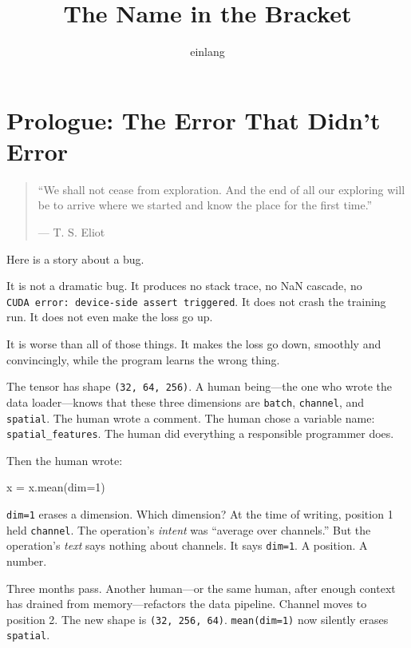 \documentclass[11pt,]{article}
\title{The Name in the Bracket}
\author{einlang}
\date{}
\newenvironment{Shaded}{}{}
\newcommand{\DecValTok}[1]{\textcolor[rgb]{0.25,0.63,0.44}{#1}}
\newcommand{\NormalTok}[1]{#1}
\newcommand{\OperatorTok}[1]{\textcolor[rgb]{0.40,0.40,0.40}{#1}}
\begin{document}
\maketitle

{
\hypersetup{linkcolor=}
\setcounter{tocdepth}{2}
\tableofcontents
}
\hypertarget{prologue-the-error-that-didnt-error}{%
\section{Prologue: The Error That Didn't
Error}\label{prologue-the-error-that-didnt-error}}

\begin{quote}
``We shall not cease from exploration. And the end of all our exploring
will be to arrive where we started and know the place for the first
time.''

--- T. S. Eliot
\end{quote}

Here is a story about a bug.

It is not a dramatic bug. It produces no stack trace, no NaN cascade, no
\texttt{CUDA\ error:\ device-side\ assert\ triggered}. It does not crash
the training run. It does not even make the loss go up.

It is worse than all of those things. It makes the loss go down,
smoothly and convincingly, while the program learns the wrong thing.

The tensor has shape \texttt{(32,\ 64,\ 256)}. A human being---the one
who wrote the data loader---knows that these three dimensions are
\texttt{batch}, \texttt{channel}, and \texttt{spatial}. The human wrote
a comment. The human chose a variable name: \texttt{spatial\_features}.
The human did everything a responsible programmer does.

Then the human wrote:

\begin{Shaded}
\begin{Highlighting}[]
\NormalTok{x }\OperatorTok{=}\NormalTok{ x.mean(dim}\OperatorTok{=}\DecValTok{1}\NormalTok{)}
\end{Highlighting}
\end{Shaded}

\texttt{dim=1} erases a dimension. Which dimension? At the time of
writing, position 1 held \texttt{channel}. The operation's \emph{intent}
was ``average over channels.'' But the operation's \emph{text} says
nothing about channels. It says \texttt{dim=1}. A position. A number.

Three months pass. Another human---or the same human, after enough
context has drained from memory---refactors the data pipeline. Channel
moves to position 2. The new shape is \texttt{(32,\ 256,\ 64)}.
\texttt{mean(dim=1)} now silently erases \texttt{spatial}.
\end{document}
